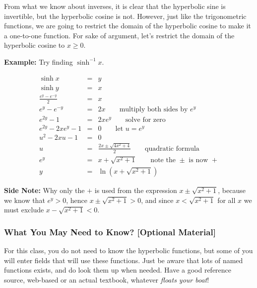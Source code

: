\documentclass[12pt,addpoints, answers, fleqn]{exam}
\begin{document}
From what we know about inverses, it is clear that the hyperbolic sine is invertible, but the hyperbolic cosine is not. However, just like the trigonometric functions, we are going to restrict the domain of the hyperbolic cosine to make it a one-to-one function. For sake of argument, let's restrict the domain of the hyperbolic cosine to $x \geq 0$.



\textbf{Example:}  Try finding $\sinh^{-1} x$.

\begin{solution}
\begin{eqnarray*}
\sinh x &=& y\\
\sinh y &=& x\\
\frac{e^y - e^{-y}}{2} &=& x\\
e^y - e^{-y} &=& 2x \qquad \mbox{multiply both sides by $e^y$}\\
e^{2y} - 1 &=& 2xe^y \qquad \mbox{solve for zero}\\
e^{2y} - 2xe^y - 1 &=& 0 \qquad \mbox{let $u = e^y$}\\
u^{2} - 2xu - 1 &=& 0 \\
u &=& \frac{2x \pm \sqrt{4x^2 + 4}}{2} \qquad \mbox{quadratic formula}\\
e^y &=& x + \sqrt{x^2 + 1} \qquad \mbox{note the $\pm$ is now $+$}\\
y &=& \ln\left(x + \sqrt{x^2 + 1}\right) 
\end{eqnarray*}



\textbf{Side Note:} Why only the $+$ is used from the expression $x \pm \sqrt{x^2 + 1}$, because we know that $e^y > 0$, hence $x \pm \sqrt{x^2 + 1} > 0$, and since $x < \sqrt{x^2 + 1}$ for all $x$ we must exclude $x - \sqrt{x^2 + 1} < 0$. 

\end{solution}

\subsubsection{What You May Need to Know? [Optional Material]}

For this class, you do not need to know the hyperbolic functions, but some of you will enter fields that will use these functions. Just be aware that lots of named functions exists, and do look them up when needed. Have a good reference source, web-based or an actual textbook, whatever \emph{floats your boat}!
\end{document}
